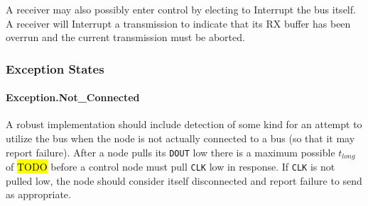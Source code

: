 A receiver may also possibly enter control by electing to Interrupt the bus
itself. A receiver will Interrupt a transmission to indicate that its RX
buffer has been overrun and the current transmission must be aborted.

\subsubsection{Exception States}

\paragraph{Exception.{\sc Not\_Connected}}
A robust implementation should include detection of some kind for an attempt
to utilize the bus when the node is not actually connected to a bus (so that
it may report failure). After a node pulls its {\tt DOUT} low there is a
maximum possible $t_{long}$ of \hl{TODO} before a control node must pull
{\tt CLK} low in response. If {\tt CLK} is not pulled low, the node should
consider itself disconnected and report failure to send as appropriate.
